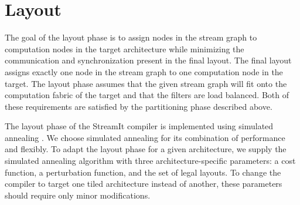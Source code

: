 \section{Layout}
\label{sec:layout}

The goal of the layout phase is to assign nodes in the stream graph to
computation nodes in the target architecture while minimizing the
communication and synchronization present in the final layout.  The
final layout assigns exactly one node in the stream graph to one
computation node in the target.  The layout phase assumes that the
given stream graph will fit onto the computation fabric of the target
and that the filters are load balanced.  Both of these requirements
are satisfied by the partitioning phase described above.



The layout phase of the StreamIt compiler is implemented using
simulated annealing \cite{simanneal}.  We choose simulated annealing
for its combination of performance and flexibly.  To adapt the layout
phase for a given architecture, we supply the simulated annealing
algorithm with three architecture-specific parameters: a cost
function, a perturbation function, and the set of legal layouts.  To
change the compiler to target one tiled architecture instead of
another, these parameters should require only minor modifications.

